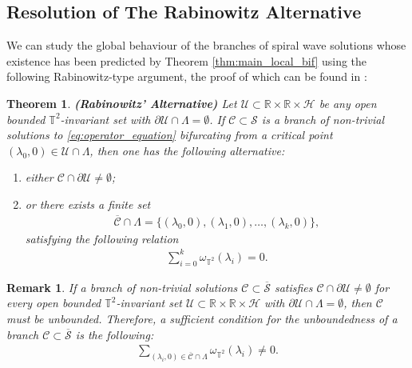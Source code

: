 \documentclass[11pt]{amsart}
\def\br{{\mathbb{R}}}
\def\bt{{\mathbb{T}}}
\def\br{\mathbb R}
\newtheorem{theorem}{Theorem}[section]
\newtheorem{remark}{Remark}[section]
\begin{document}
\subsection{Resolution of The Rabinowitz Alternative} \label{sec:rab_alt}
We can study the global behaviour of the branches of spiral wave solutions whose existence has been predicted by Theorem \ref{thm:main_local_bif} using the following Rabinowitz-type argument, the proof of which can be found in \cite{book-new, AED}:
\begin{theorem} \rm \label{thm:rab_alt} {\bf (Rabinowitz' Alternative)}
Let $\mathcal U \subset \br \times \br \times \mathscr H$ be any open bounded $\bt^2$-invariant set with $\partial \mathcal U \cap \Lambda = \emptyset$. If $\mathcal C \subset \mathscr S$ is a branch of non-trivial solutions to \eqref{eq:operator_equation} bifurcating from a critical point $(\lambda_0,0) \in \mathcal U \cap \Lambda$, then one has the following alternative: 
\begin{enumerate}[label=$(\alph*)$]
\item\label{alt_a}  either $\mathcal C \cap \partial \mathcal U \neq \emptyset$;
    \item\label{alt_b} or there exists a finite set
    \begin{align*}
        \overline{\mathcal C} \cap \Lambda = \{ (\lambda_0,0),(\lambda_1,0), \ldots, (\lambda_{k},0) \},
    \end{align*}
    satisfying the following relation
    \begin{align*}
    \sum\limits_{i=0}^{k} \omega_{\bt^2}(\lambda_i) = 0.
    \end{align*}
\end{enumerate} 
\end{theorem}
\begin{remark} \rm
    If a branch of non-trivial solutions $\mathcal C \subset \overline{\mathscr S}$ satisfies $\mathcal C \cap \partial \mathcal U \neq \emptyset$ for every open bounded $\bt^2$-invariant set $\mathcal U \subset \br \times \br \times \mathscr H$ with $\partial \mathcal U \cap \Lambda = \emptyset$, then  $\mathcal C$ must be {\it unbounded}. Therefore, a sufficient condition for the unboundedness of a branch $\mathcal C \subset \overline{\mathscr S}$ is the following:
        \begin{align*}
        \sum\limits_{(\lambda_i,0) \in\overline{\mathcal C} \cap \Lambda} \omega_{\bt^2}(\lambda_i) \neq 0.
    \end{align*}
\end{remark}
\end{document}
